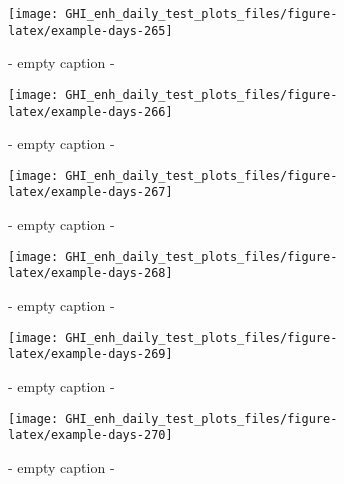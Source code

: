 \documentclass[
  10pt,
  a4paper,oneside]{article}
\begin{document}
\begin{figure}[H]

{\centering \texttt{[image: GHI\_enh\_daily\_test\_plots\_files/figure-latex/example-days-265]} 

}

\caption{ - empty caption - }\label{fig:example-days-265}
\end{figure}

\begin{figure}[H]

{\centering \texttt{[image: GHI\_enh\_daily\_test\_plots\_files/figure-latex/example-days-266]} 

}

\caption{ - empty caption - }\label{fig:example-days-266}
\end{figure}

\begin{figure}[H]

{\centering \texttt{[image: GHI\_enh\_daily\_test\_plots\_files/figure-latex/example-days-267]} 

}

\caption{ - empty caption - }\label{fig:example-days-267}
\end{figure}

\begin{figure}[H]

{\centering \texttt{[image: GHI\_enh\_daily\_test\_plots\_files/figure-latex/example-days-268]} 

}

\caption{ - empty caption - }\label{fig:example-days-268}
\end{figure}

\begin{figure}[H]

{\centering \texttt{[image: GHI\_enh\_daily\_test\_plots\_files/figure-latex/example-days-269]} 

}

\caption{ - empty caption - }\label{fig:example-days-269}
\end{figure}

\begin{figure}[H]

{\centering \texttt{[image: GHI\_enh\_daily\_test\_plots\_files/figure-latex/example-days-270]} 

}

\caption{ - empty caption - }\label{fig:example-days-270}
\end{figure}
\end{document}
